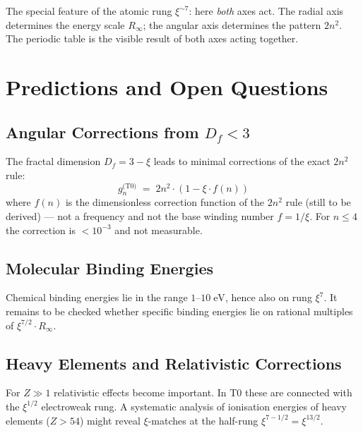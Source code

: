 \vspace{0.5em}

The special feature of the atomic rung $\xi^{\sim 7}$: here \emph{both} axes
act. The radial axis determines the energy scale $R_\infty$; the angular axis
determines the pattern $2n^2$. The periodic table is the visible result of
both axes acting together.

\section{Predictions and Open Questions}
\label{sec:predictions}

\subsection{Angular Corrections from \texorpdfstring{$D_f < 3$}{Df<3}}

The fractal dimension $D_f = 3 - \xi$ leads to minimal corrections of the
exact $2n^2$ rule:
\begin{equation}
  g_n^\text{(T0)} \;=\; 2n^2 \cdot (1 - \xi \cdot f(n))
\end{equation}
where $f(n)$ is the dimensionless correction function of the $2n^2$ rule (still to be derived) --- not a frequency and not the base winding number $f = 1/\xi$.
For $n \leq 4$ the correction is $< 10^{-3}$ and not measurable.

\subsection{Molecular Binding Energies}

Chemical binding energies lie in the range $1$–$10\;\text{eV}$, hence also
on rung $\xi^7$. It remains to be checked whether specific binding energies
lie on rational multiples of $\xi^{7/2} \cdot R_\infty$.

\subsection{Heavy Elements and Relativistic Corrections}

For $Z \gg 1$ relativistic effects become important. In T0 these are connected
with the $\xi^{1/2}$ electroweak rung. A systematic analysis of ionisation
energies of heavy elements ($Z > 54$) might reveal $\xi$-matches at the
half-rung $\xi^{7-1/2} = \xi^{13/2}$.

